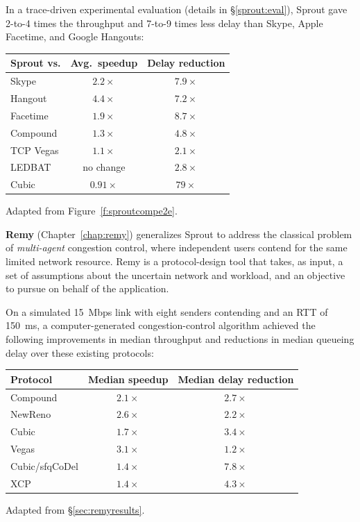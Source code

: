 In a trace-driven experimental evaluation (details in
\S\ref{sprout:eval}), Sprout gave 2-to-4 times the throughput and
7-to-9 times less delay than Skype, Apple Facetime, and Google
Hangouts:

\begin{center}
\noindent \begin{tabular}{|l|c|c|}
\hline
Sprout vs. & Avg.~speedup & Delay reduction \\
\hline
\hline
Skype & $2.2\times$ & $7.9\times$\\
Hangout & $4.4\times$ & $7.2\times$\\
Facetime & $1.9\times$ & $8.7\times$\\
\hline
Compound & $1.3\times$ & $4.8\times$\\
TCP Vegas & $1.1\times$ & $2.1\times$\\
LEDBAT & no change & $2.8\times$\\
Cubic & \cellcolor{red!20}$0.91\times$ & $79\times$\\
\hline
\end{tabular}

{\footnotesize Adapted from Figure~\ref{f:sproutcompe2e}.}

\end{center}

\textbf{Remy} (Chapter~\ref{chap:remy}) generalizes Sprout to address
the classical problem of \emph{multi-agent} congestion control, where
independent users contend for the same limited network resource. Remy
is a protocol-design tool that takes, as input, a set of assumptions
about the uncertain network and workload, and an objective to pursue
on behalf of the application.

On a simulated 15~Mbps link with eight senders contending and an RTT
of 150~ms, a computer-generated congestion-control algorithm achieved
the following improvements in median throughput and reductions in
median queueing delay over these existing protocols:

\begin{center}

\begin{tabular}{|l|c|c|}
\hline
Protocol & Median speedup & Median delay reduction \\
\hline
\hline
Compound & $2.1\times$ & $2.7\times$ \\
NewReno & $2.6\times$ & $2.2\times$ \\
Cubic & $1.7\times$ & $3.4\times$ \\
Vegas & $3.1\times$ & $1.2\times$ \\
\hline
Cubic/sfqCoDel & $1.4\times$ & $7.8\times$ \\
XCP & $1.4\times$ & $4.3\times$ \\
\hline
\end{tabular}

{\footnotesize Adapted from \S\ref{sec:remyresults}.}

\end{center}

